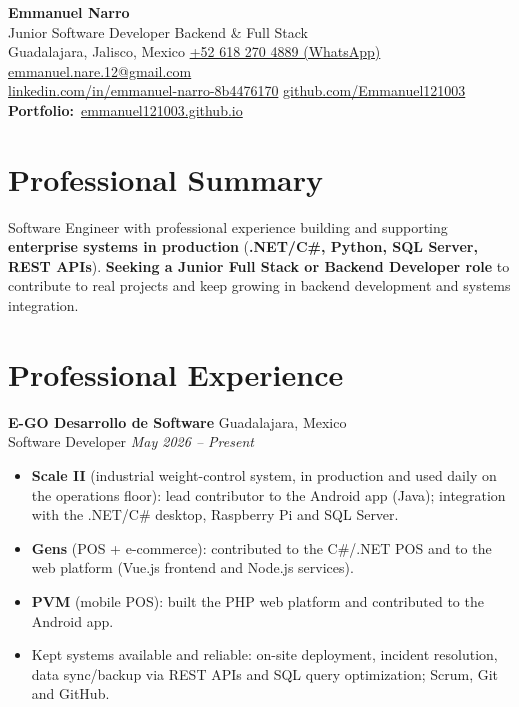 \documentclass[10pt,a4paper]{article}
\newcommand{\entry}[4]{%
  \textbf{#1} \hfill {\color{muted}\small #2}\\[0pt]
  {\color{accent}\small #3} \hfill {\color{muted}\itshape\small #4}\\[1pt]
}
\begin{document}
\begin{center}
  {\color{ink}\LARGE\bfseries Emmanuel Narro}\\[2pt]
  {\color{accent} Junior Software Developer \textbar{} Backend \& Full Stack}\\[3pt]
  {\color{muted}\small
   Guadalajara, Jalisco, Mexico \enspace\textbullet\enspace
   \href{https://wa.me/526182704889}{+52 618 270 4889 (WhatsApp)} \enspace\textbullet\enspace
   \href{mailto:emmanuel.nare.12@gmail.com}{emmanuel.nare.12@gmail.com}\\[1pt]
   \href{https://www.linkedin.com/in/emmanuel-narro-8b4476170}{linkedin.com/in/emmanuel-narro-8b4476170}
   \enspace\textbullet\enspace
   \href{https://github.com/Emmanuel121003}{github.com/Emmanuel121003}
   \enspace\textbullet\enspace
   {\color{accent}\textbf{Portfolio:}}~\href{https://emmanuel121003.github.io/}{emmanuel121003.github.io}}
\end{center}

\section{Professional Summary}
Software Engineer with professional experience building and supporting \textbf{enterprise systems in production}
(\textbf{.NET/C\#, Python, SQL Server, REST APIs}). \textbf{Seeking a Junior Full Stack or Backend Developer role} to
contribute to real projects and keep growing in backend development and systems integration.

\section{Professional Experience}

\entry{E-GO Desarrollo de Software}{Guadalajara, Mexico}{Software Developer}{May 2026 -- Present}
\begin{itemize}
  \item \textbf{Scale II} (industrial weight-control system, in production and used daily on the operations floor): lead contributor to the Android app (Java); integration with the .NET/C\# desktop, Raspberry Pi and SQL Server.
  \item \textbf{Gens} (POS + e-commerce): contributed to the C\#/.NET POS and to the web platform (Vue.js frontend and Node.js services).
  \item \textbf{PVM} (mobile POS): built the PHP web platform and contributed to the Android app.
  \item Kept systems available and reliable: on-site deployment, incident resolution, data sync/backup via REST APIs and SQL query optimization; Scrum, Git and GitHub.
\end{itemize}
\end{document}
